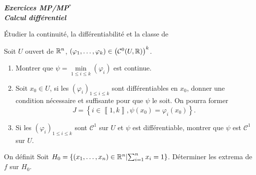 \documentclass[12pt]{article}
\begin{document}
\begin{titlepage}
	\centering
	\vspace*{\fill}
	\Huge \textit{\textbf{Exercices MP/MP$^*$\\ Calcul différentiel}}
	\vspace*{\fill}
\end{titlepage}

\begin{exercise}
	Étudier la continuité, la différentiabilité et la classe de 
\end{exercise}

\begin{exercise}
	Soit $U$ ouvert de $\mathbb{R}^{n}$, $(\varphi_1,\dots,\varphi_{k})\in\left(\mathcal{C}^{0}(U,\mathbb{R})\right)^{k}$.
	\begin{enumerate}
		\item Montrer que $\psi=\min\limits_{1\leqslant i\leqslant k}(\varphi_i)$ est continue.
		\item Soit $x_0\in U$, si les $(\varphi_i)_{1\leqslant i\leqslant k}$ sont différentiables en $x_0$, donner une condition nécessaire et suffisante pour que $\psi$ le soit. On pourra former 
		\begin{equation}
			J=\left\lbrace i\in\left\llbracket1,k\right\rrbracket,\psi(x_0)=\varphi_i(x_0)\right\rbrace.
		\end{equation}
		\item Si les $(\varphi_i)_{1\leqslant i\leqslant k}$ sont $\mathcal{C}^{1}$ sur $U$ et $\psi$ est différentiable, montrer que $\psi$ est $\mathcal{C}^{1}$ sur $U$.
	\end{enumerate}
\end{exercise}

\begin{exercise}
	On définit 
	Soit $H_0=\left\lbrace(x_1,\dots,x_n)\in\mathbb{R}^{n}\middle|\sum_{i=1}^{n}x_i=1\right\rbrace$. Déterminer les extrema de $f$ sur $H_0$.
\end{exercise}
\end{document}
